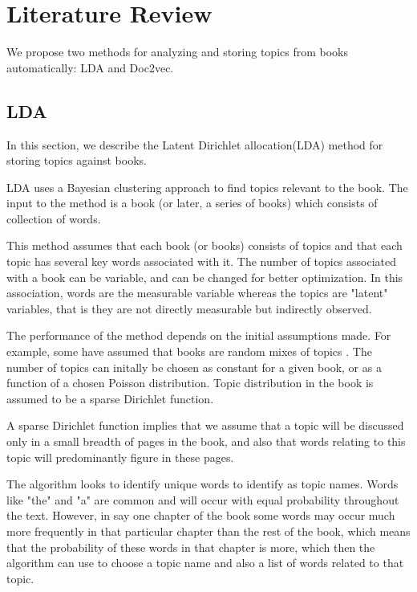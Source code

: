 
\section{Literature Review} \label{section:algorithms}
We propose two methods for analyzing and storing topics from books automatically: LDA and Doc2vec. 

\subsection{LDA}
\par In this section, we describe the Latent Dirichlet allocation(LDA) method for storing topics against books. 
\par LDA uses a Bayesian clustering approach to find topics relevant to the book. \cite{RefWorks:doc:5a721fb5e4b0d609eec83aa1} The input to the method is a book (or later, a series of books) which consists of collection of words. 
\par This method assumes that each book (or books) consists of topics and that each topic has several key words associated with it. The number of topics associated with a book can be variable, and can be changed for better optimization. In this association, words are the measurable variable whereas the topics are "latent" variables, that is they are not directly measurable but indirectly observed. 
\par The performance of the method depends on the initial assumptions made. For example, some have assumed that books are random mixes of topics \cite{RefWorks:doc:5a721e4ae4b095066af57410}. The number of topics can initally be chosen as constant for a given book, or as a function of a chosen Poisson distribution. \cite{RefWorks:doc:5a721e4ae4b095066af57410} Topic distribution in the book is assumed to be a sparse Dirichlet function.
\par A sparse Dirichlet function implies that we assume that a topic will be discussed only in a small breadth of pages in the book, and also that words relating to this topic will predominantly figure in these pages.
\par The algorithm looks to identify unique words to identify as topic names. Words like "the" and "a" are common and will occur with equal probability throughout the text. However, in say one chapter of the book some words may occur much more frequently in that particular chapter than the rest of the book, which means that the probability of these words in that chapter is more, which then the algorithm can use to choose a topic name and also a list of words related to that topic.

